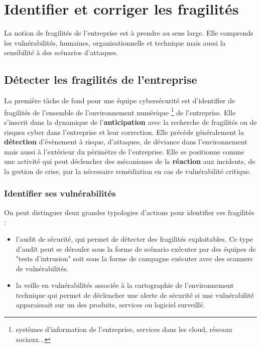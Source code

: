 

\section{Identifier et corriger les fragilités}

La notion de  fragilités de l'entreprise est à prendre au sens large. Elle comprends les vulnérabilités, humaines, organisationnelle et technique mais aussi la sensibilité à des scénarios d'attaques.

\subsection{Détecter les fragilités de l’entreprise}

La première tâche de fond pour une équipe cybersécurité est  d'identifier de fragilités de l'ensemble de l'environnement numérique \footnote{systèmes d'information de l'entreprise, services dans les cloud, réseaux sociaux...} de l'entreprise. Elle s'inscrit dans la dynamique de  l'\textbf{anticipation} avec la recherche de fragilités ou de risques cyber dans l'entreprise et leur correction. Elle précède généralement la \textbf{détection} d'évènement à risque, d'attaques, de déviance dans l'environnement mais aussi à l'extérieur du périmètre de l'entreprise.
Elle se positionne comme une activité  qui peut déclencher des mécanismes de la  \textbf{réaction} aux incidents, de la gestion de crise, par la nécessaire remédiation en cas de vulnérabilité critique.

\begin{frame}
\frametitle<presentation>{Identifier ses vulnérabilités}
On peut distinguer deux grandes typologies d'actions pour identifier ces fragilités :
\begin{itemize}
	\item  l'audit  de sécurité, qui permet de détecter des fragilités exploitables. Ce type d'audit peut se dérouler sous la forme de scénario exécuter par des équipes de "tests d'intrusion" soit sous la forme de campagne exécuter avec des scanners de vulnérabilités.
	\item la veille en vulnérabilités associée à la cartographie de l'environnement technique qui permet de déclencher une alerte de sécurité si une vulnérabilité apparaissait sur un des produits, services ou logiciel surveillé.
\end{itemize}
\end{frame}

